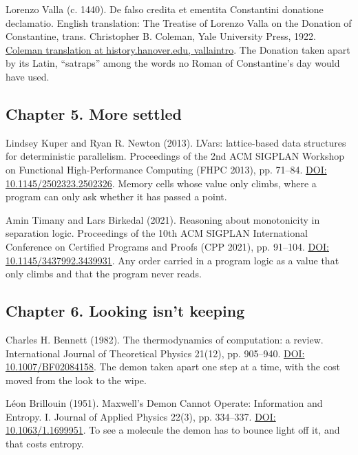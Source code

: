 \documentclass[11pt,twoside]{article}
\theoremstyle{thielethm}
\theoremstyle{thieledef}
\theoremstyle{thieledef}
\theoremstyle{thieledef}
\theoremstyle{thielethm}
\theoremstyle{thieleobs}
\theoremstyle{thielethm}
\begin{document}
\noindent Lorenzo Valla (c. 1440). De falso credita et ementita Constantini donatione declamatio. English translation: The Treatise of Lorenzo Valla on the Donation of Constantine, trans. Christopher B. Coleman, Yale University Press, 1922. \href{https://history.hanover.edu/texts/vallaintro.html}{Coleman translation at history.hanover.edu, vallaintro}. The Donation taken apart by its Latin, ``satraps'' among the words no Roman of Constantine's day would have used.
\par\medskip

\subsection*{Chapter 5. More settled}

\noindent Lindsey Kuper and Ryan R. Newton (2013). LVars: lattice-based data structures for deterministic parallelism. Proceedings of the 2nd ACM SIGPLAN Workshop on Functional High-Performance Computing (FHPC 2013), pp. 71--84. \href{https://doi.org/10.1145/2502323.2502326}{DOI: 10.1145/2502323.2502326}. Memory cells whose value only climbs, where a program can only ask whether it has passed a point.
\par\medskip

\noindent Amin Timany and Lars Birkedal (2021). Reasoning about monotonicity in separation logic. Proceedings of the 10th ACM SIGPLAN International Conference on Certified Programs and Proofs (CPP 2021), pp. 91--104. \href{https://doi.org/10.1145/3437992.3439931}{DOI: 10.1145/3437992.3439931}. Any order carried in a program logic as a value that only climbs and that the program never reads.
\par\medskip

\subsection*{Chapter 6. Looking isn't keeping}

\noindent Charles H. Bennett (1982). The thermodynamics of computation: a review. International Journal of Theoretical Physics 21(12), pp. 905--940. \href{https://doi.org/10.1007/BF02084158}{DOI: 10.1007/BF02084158}. The demon taken apart one step at a time, with the cost moved from the look to the wipe.
\par\medskip

\noindent L\'eon Brillouin (1951). Maxwell's Demon Cannot Operate: Information and Entropy. I. Journal of Applied Physics 22(3), pp. 334--337. \href{https://doi.org/10.1063/1.1699951}{DOI: 10.1063/1.1699951}. To see a molecule the demon has to bounce light off it, and that costs entropy.
\par\medskip
\end{document}
